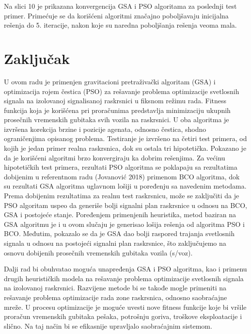 
Na slici 10 je prikazana konvergencija GSA i PSO algoritama za poslednji test primer. Primećuje se da korišćeni algoritmi značajno poboljšavaju inicijalna rešenja do 5. iteracije, nakon koje su naredna poboljšanja rešenja veoma mala.


\section{Zaključak}

U ovom radu je primenjen gravitacioni pretraživački algoritam (GSA) i optimizacija rojem čestica (PSO) za rešavanje problema optimizacije svetlosnih signala na izolovanoj signalisanoj raskrsnici u fiksnom režimu rada. Fitness funkcija koja je korišćena pri proračunima predstavlja minimizaciju ukupnih prosečnih vremenskih gubitaka svih vozila na raskrsnici. U oba algoritma je izvršena korekcija brzine i pozicije agenata, odnosno čestica, shodno ograničenjima opisanog problema. Testiranje je izvršeno na četiri test primera, od kojih je jedan primer realna raskrsnica, dok su ostala tri hipotetička. Pokazano je da je korišćeni algoritmi brzo konvergiraju ka dobrim rešenjima. Za većinu hipotetičkih test primera, rezultati PSO algoritma se poklapaju sa rezultatima dobijenim u referentnom radu (Jovanović 2018) primenom BCO algoritma, dok su rezultati GSA algoritma uglavnom lošiji u poređenju sa navedenim metodama. Prema dobijenim rezultatima za realnu test raskrsnicu, može se zaključiti da je PSO algoritam uspeo da generiše bolji signalni plan raskrsnice u odnosu na BCO, GSA i postojeće stanje. Poređenjem primenjenih heuristika, metod baziran na GSA algoritmu je i u ovom slučaju je generisao lošija rešenja od algoritma PSO i BCO. Međutim, pokazalo se da je GSA dao bolji raspored trajanja svetlosnih signala u odnosu na postojeći signalni plan raskrsnice, što zaključujemo na osnovu dobijenih prosečnih vremenskih gubitaka vozila (s/voz).

Dalji rad bi obuhvatao moguća unapređenja GSA i PSO algoritma, kao i primenu drugih heurističkih modela na rešavanje problema optimizacije svetlosnih signala na izolovanoj raskrsnici. Razvijene metode bi se takođe mogle primeniti na rešavanje problema optimizacije rada zone raskrsnica, odnosno saobraćajne mreže. U procesu optimizacije je moguće uvesti nove fitness funkcije koje bi vršile proračun vremenskih gubitaka pešaka, potrošnju goriva, troškove eksploatacije i slično. Na taj način bi se efikasnije upravljalo saobraćajnim sistemom. 

